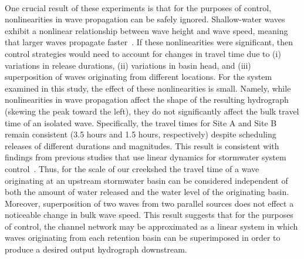 \

One crucial result of these experiments is that for the purposes of control, nonlinearities in wave propagation can be safely ignored. Shallow-water waves exhibit a nonlinear relationship between wave height and wave speed, meaning that larger waves propagate faster~\cite{kinnmark2012shallow}. %
If these nonlinearities were significant, then control strategies would need to account for changes in travel time due to (i) variations in release durations, (ii) variations in basin head, and (iii) superposition of waves originating from different locations.
For the system examined in this study, the effect of these nonlinearities is small. Namely, while nonlinearities in wave propagation affect the shape of the resulting hydrograph (skewing the peak toward the left), they do not significantly affect the bulk travel time of an isolated wave.
Specifically, the travel times for Site A and Site B remain consistent (3.5 hours and 1.5 hours, respectively) despite scheduling releases of different durations and magnitudes. This result is consistent with findings from previous studies that use linear dynamics for stormwater system control~\cite{Litrico_2004, Marinaki_2003, Garcia_2015}.
Thus, for the scale of our creekshed the travel time of a wave originating at an upstream stormwater basin can be considered independent of both the amount of water released and the water level of the originating basin. Moreover, superposition of two waves from two parallel sources does not effect a noticeable change in bulk wave speed. This result suggests that for the purposes of control, the channel network may be approximated as a linear system in which waves originating from each retention basin can be superimposed in order to produce a desired output hydrograph downstream. 


